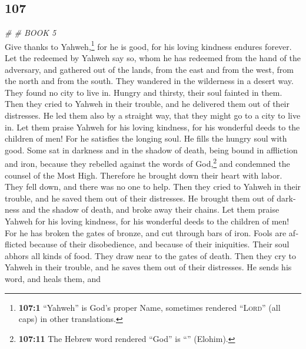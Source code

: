 \begin{paracol}{2}
\switchcolumn
\begin{otherlanguage}{english}

\hypertarget{section-213}{%
\section{107}\label{section-213}}

\emph{\# \# BOOK 5}\\

 Give thanks to Yahweh,\footnote{\textbf{107:1} ``Yahweh''
  is God's proper Name, sometimes rendered ``\textsc{Lord}'' (all caps)
  in other translations.} for he is good, for his loving kindness
endures forever.  Let the redeemed by Yahweh say so, whom
he has redeemed from the hand of the adversary,  and
gathered out of the lands, from the east and from the west, from the
north and from the south.  They wandered in the wilderness
in a desert way. They found no city to live in.  Hungry
and thirsty, their soul fainted in them.  Then they cried
to Yahweh in their trouble, and he delivered them out of their
distresses.  He led them also by a straight way, that they
might go to a city to live in.  Let them praise Yahweh for
his loving kindness, for his wonderful deeds to the children of men!
 For he satisfies the longing soul. He fills the hungry
soul with good.  Some sat in darkness and in the shadow
of death, being bound in affliction and iron,  because
they rebelled against the words of God,\footnote{\textbf{107:11} The
  Hebrew word rendered ``God'' is ``'' (Elohim).} and
condemned the counsel of the Most High.  Therefore he
brought down their heart with labor. They fell down, and there was no
one to help.  Then they cried to Yahweh in their trouble,
and he saved them out of their distresses.  He brought
them out of darkness and the shadow of death, and broke away their
chains.  Let them praise Yahweh for his loving kindness,
for his wonderful deeds to the children of men!  For he
has broken the gates of bronze, and cut through bars of iron.
 Fools are afflicted because of their disobedience, and
because of their iniquities.  Their soul abhors all kinds
of food. They draw near to the gates of death.  Then they
cry to Yahweh in their trouble, and he saves them out of their
distresses.  He sends his word, and heals them, and

\end{otherlanguage}
\end{paracol}
